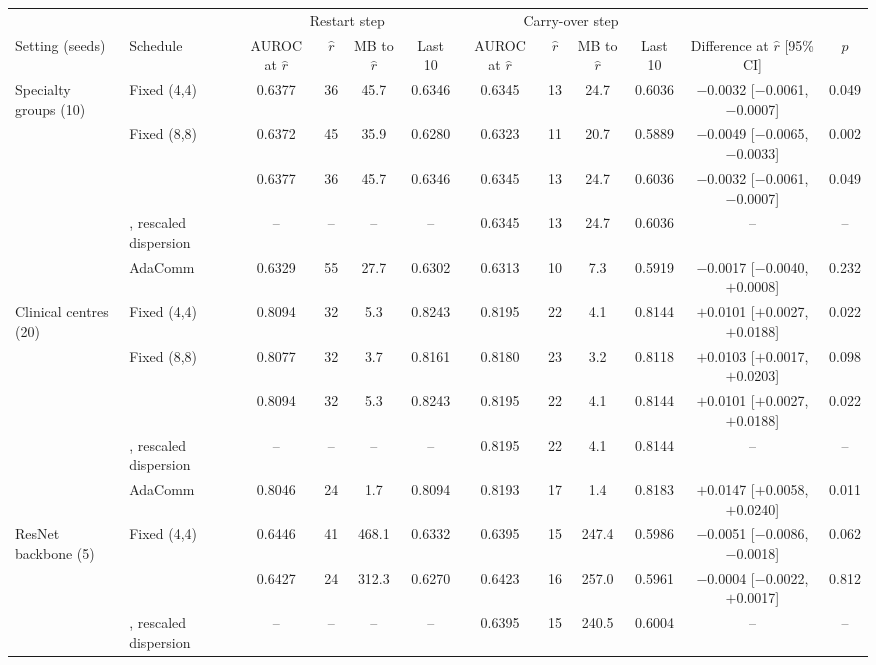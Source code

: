 \begin{tabular}{@{}llcccccccccc@{}}
\toprule
 & & \multicolumn{4}{c}{Restart step} & \multicolumn{4}{c}{Carry-over step} & & \\
\cmidrule(lr){3-6}\cmidrule(lr){7-10}
Setting (seeds) & Schedule & AUROC at $\hat r$ & $\hat r$ & MB to $\hat r$ & Last 10 & AUROC at $\hat r$ & $\hat r$ & MB to $\hat r$ & Last 10 & Difference at $\hat r$ [95\% CI] & $p$\\
\midrule
Specialty groups (10) & Fixed (4,4) & 0.6377 & 36 & 45.7 & 0.6346 & 0.6345 & 13 & 24.7 & 0.6036 & \ensuremath{-}0.0032 [\ensuremath{-}0.0061, \ensuremath{-}0.0007] & 0.049\\
 & Fixed (8,8) & 0.6372 & 45 & 35.9 & 0.6280 & 0.6323 & 11 & 20.7 & 0.5889 & \ensuremath{-}0.0049 [\ensuremath{-}0.0065, \ensuremath{-}0.0033] & 0.002\\
 & \tierfed{} & 0.6377 & 36 & 45.7 & 0.6346 & 0.6345 & 13 & 24.7 & 0.6036 & \ensuremath{-}0.0032 [\ensuremath{-}0.0061, \ensuremath{-}0.0007] & 0.049\\
 & \tierfed{}, rescaled dispersion & -- & -- & -- & -- & 0.6345 & 13 & 24.7 & 0.6036 & -- & --\\
 & AdaComm & 0.6329 & 55 & 27.7 & 0.6302 & 0.6313 & 10 & 7.3 & 0.5919 & \ensuremath{-}0.0017 [\ensuremath{-}0.0040, \ensuremath{+}0.0008] & 0.232\\
\midrule
Clinical centres (20) & Fixed (4,4) & 0.8094 & 32 & 5.3 & 0.8243 & 0.8195 & 22 & 4.1 & 0.8144 & \ensuremath{+}0.0101 [\ensuremath{+}0.0027, \ensuremath{+}0.0188] & 0.022\\
 & Fixed (8,8) & 0.8077 & 32 & 3.7 & 0.8161 & 0.8180 & 23 & 3.2 & 0.8118 & \ensuremath{+}0.0103 [\ensuremath{+}0.0017, \ensuremath{+}0.0203] & 0.098\\
 & \tierfed{} & 0.8094 & 32 & 5.3 & 0.8243 & 0.8195 & 22 & 4.1 & 0.8144 & \ensuremath{+}0.0101 [\ensuremath{+}0.0027, \ensuremath{+}0.0188] & 0.022\\
 & \tierfed{}, rescaled dispersion & -- & -- & -- & -- & 0.8195 & 22 & 4.1 & 0.8144 & -- & --\\
 & AdaComm & 0.8046 & 24 & 1.7 & 0.8094 & 0.8193 & 17 & 1.4 & 0.8183 & \ensuremath{+}0.0147 [\ensuremath{+}0.0058, \ensuremath{+}0.0240] & 0.011\\
\midrule
ResNet backbone (5) & Fixed (4,4) & 0.6446 & 41 & 468.1 & 0.6332 & 0.6395 & 15 & 247.4 & 0.5986 & \ensuremath{-}0.0051 [\ensuremath{-}0.0086, \ensuremath{-}0.0018] & 0.062\\
 & \tierfed{} & 0.6427 & 24 & 312.3 & 0.6270 & 0.6423 & 16 & 257.0 & 0.5961 & \ensuremath{-}0.0004 [\ensuremath{-}0.0022, \ensuremath{+}0.0017] & 0.812\\
 & \tierfed{}, rescaled dispersion & -- & -- & -- & -- & 0.6395 & 15 & 240.5 & 0.6004 & -- & --\\
\bottomrule
\end{tabular}
